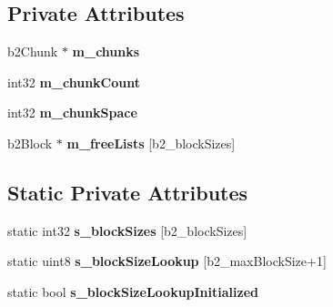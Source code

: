 \subsection*{Private Attributes}
\begin{DoxyCompactItemize}
\item 
b2\+Chunk $\ast$ {\bfseries m\+\_\+chunks}\hypertarget{classb2_block_allocator_a340443648b0c00b3e901fd5460759a0c}{}\label{classb2_block_allocator_a340443648b0c00b3e901fd5460759a0c}

\item 
int32 {\bfseries m\+\_\+chunk\+Count}\hypertarget{classb2_block_allocator_a6f23a8eb32475bf1766ddd94a8c00b99}{}\label{classb2_block_allocator_a6f23a8eb32475bf1766ddd94a8c00b99}

\item 
int32 {\bfseries m\+\_\+chunk\+Space}\hypertarget{classb2_block_allocator_ad4861c267d5d9392b10a2a0e44ec93e8}{}\label{classb2_block_allocator_ad4861c267d5d9392b10a2a0e44ec93e8}

\item 
b2\+Block $\ast$ {\bfseries m\+\_\+free\+Lists} \mbox{[}b2\+\_\+block\+Sizes\mbox{]}\hypertarget{classb2_block_allocator_af61bf3e75cc51ddbfbc5d10681b62df1}{}\label{classb2_block_allocator_af61bf3e75cc51ddbfbc5d10681b62df1}

\end{DoxyCompactItemize}
\subsection*{Static Private Attributes}
\begin{DoxyCompactItemize}
\item 
static int32 {\bfseries s\+\_\+block\+Sizes} \mbox{[}b2\+\_\+block\+Sizes\mbox{]}\hypertarget{classb2_block_allocator_ae0f98e3e0d0dd2ddf64d3e8c789579b0}{}\label{classb2_block_allocator_ae0f98e3e0d0dd2ddf64d3e8c789579b0}

\item 
static uint8 {\bfseries s\+\_\+block\+Size\+Lookup} \mbox{[}b2\+\_\+max\+Block\+Size+1\mbox{]}\hypertarget{classb2_block_allocator_aaa13e9e67ad9b03b224509c42d9fae38}{}\label{classb2_block_allocator_aaa13e9e67ad9b03b224509c42d9fae38}

\item 
static bool {\bfseries s\+\_\+block\+Size\+Lookup\+Initialized}\hypertarget{classb2_block_allocator_a8133162b02c5bb0d8a9abbcadd899524}{}\label{classb2_block_allocator_a8133162b02c5bb0d8a9abbcadd899524}

\end{DoxyCompactItemize}


